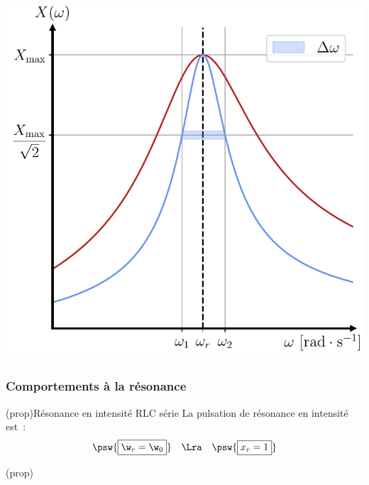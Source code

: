 \documentclass[../../main/main.tex]{subfiles}
\begin{document}
\begin{tcb*}[sidebyside, righthand ratio=.4]
\begin{center}
{			\includegraphics[width=.8\linewidth]{bande_pass_prof}
		}%
		\vspace{-15pt}
	\end{center}
\end{tcb*}

\subsubsection{Comportements à la résonance}

\begin{tcb*}(prop){Résonance en intensité RLC série}
	La pulsation de résonance en intensité est~:
	\[
		\psw{%
			\boxed{\w_r = \w_0}
		}%
		\quad \Lra \quad
		\psw{%
			\boxed{x_r = 1}
		}
	\]
	\begin{isd}(prop)
		\psw{%
			\[
				\boxed{I(x_r) = I\ind{max} = \frac{E_0}{R}}
			\]
		}%
		\vspace{-15pt}
		\tcblower
		\psw{%
			\[
				\boxed{\f_i(x_r) = 0}
			\]
		}%
		\vspace{-15pt}
	\end{isd}
\end{tcb*}
\end{document}
